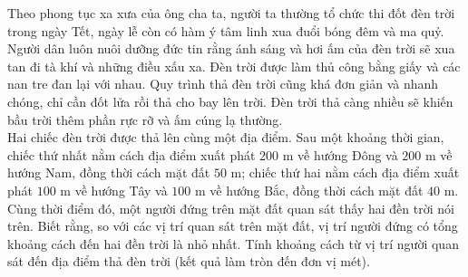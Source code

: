 \begin{bt}%
	Theo phong tục xa xưa của ông cha ta, người ta thường tổ chức thi đốt đèn trời trong ngày Tết, ngày lễ còn có hàm ý tâm linh xua đuổi bóng đêm và ma quỷ. Người dân luôn nuôi dưỡng đức tin rằng ánh sáng và hơi ấm của đèn trời sẽ xua tan đi tà khí và những điều xấu xa. Đèn trời được làm thủ công bằng giấy và các nan tre đan lại với nhau. Quy trình thả đèn trời cũng khá đơn giản và nhanh chóng, chỉ cần đốt lửa rồi thả cho bay lên trời. Đèn trời thả càng nhiều sẽ khiến bầu trời thêm phần rực rỡ và ấm cúng lạ thường.\\
	Hai chiếc đèn trời được thả lên cùng một địa điểm. Sau một khoảng thời gian, chiếc thứ nhất nằm cách địa điểm xuất phát $200$ m về hướng Đông và $200$ m về hướng Nam, đồng thời cách mặt đất $50$ m; chiếc thứ hai nằm cách địa điểm xuất phát $100$ m về hướng Tây và $100$ m về hướng Bắc, đồng thời cách mặt đất $40$ m. Cùng thời điểm đó, một người đứng trên mặt đất quan sát thấy hai đền trời nói trên. Biết rằng, so với các vị trí quan sát trên mặt đất, vị trí người đứng có tổng khoảng cách đến hai đền trời là nhỏ nhất. Tính khoảng cách từ vị trí người quan sát đến địa điểm thả đèn trời (kết quả làm tròn đến đơn vị mét). 
	

\end{bt}
